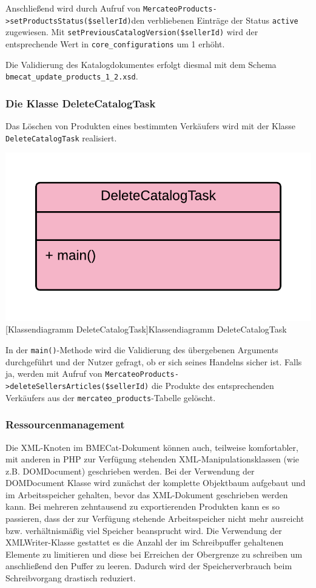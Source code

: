	Anschließend wird durch Aufruf von \texttt{MercateoProducts->setProductsStatus(\$sellerId)}den verbliebenen Einträge der Status \texttt{active} zugewiesen. Mit \texttt{setPreviousCatalogVersion(\$seller\-Id)} wird der entsprechende Wert in \texttt{core\_configurations} um 1 erhöht.
	
	Die Validierung des Katalogdokumentes erfolgt diesmal mit dem Schema \texttt{bmecat\_update\_products\_1\_2.xsd}.
	
	\subsubsection{Die Klasse DeleteCatalogTask}
	
	Das Löschen von Produkten eines bestimmten Verkäufers wird mit der Klasse \texttt{DeleteCatalogTask} realisiert. 
	
	\begin{minipage}{\linewidth}
		\vspace{1em}
		\centering
		\includegraphics[width=0.4 \linewidth]{img/DeleteCatalogTask}
		[Klassendiagramm DeleteCatalogTask]{Klassendiagramm DeleteCatalogTask}
		\vspace{1em}
	\end{minipage}	
	
	In der \texttt{main()}-Methode wird die Validierung des übergebenen Arguments durchgeführt und der Nutzer gefragt, ob er sich seines Handelns sicher ist. Falls ja, werden mit Aufruf von \texttt{MercateoProducts->deleteSellersArticles(\$sellerId)} die Produkte des entsprechenden Verkäufers aus der \texttt{mercateo\_products}-Tabelle gelöscht.

	\subsubsection{Ressourcenmanagement}
	
	Die XML-Knoten im BMECat-Dokument können auch, teilweise komfortabler, mit anderen in PHP zur Verfügung stehenden XML-Manipulationsklassen (wie z.B.  DOMDocument) geschrieben werden. Bei der Verwendung der DOMDocument Klasse wird zunächst der komplette Objektbaum aufgebaut und im Arbeitsspeicher gehalten, bevor das XML-Dokument geschrieben werden kann. Bei mehreren zehntausend zu exportierenden Produkten kann es so passieren, dass der zur Verfügung stehende Arbeitsspeicher nicht mehr ausreicht bzw. verhältnismäßig viel Speicher beansprucht wird. Die Verwendung der XMLWriter-Klasse gestattet es die Anzahl der im Schreibpuffer gehaltenen Elemente zu limitieren und diese bei Erreichen der Obergrenze zu schreiben um anschließend den Puffer zu leeren. Dadurch wird der Speicherverbrauch beim Schreibvorgang drastisch reduziert. 
		
